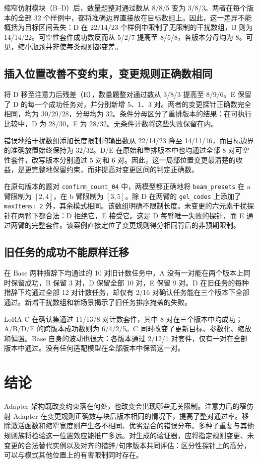 缩窄仿射模块（B--D）后，数量题整对通过数从 8/8/5 变为 3/8/3。两者在每个版本的全部 32 个样例中，都将准确边界直接放在目标数组上。因此，这一差异不能概括为目标区间丢失：D 在 22/14/23 个样例中限制了无限制的干扰数组，B 则为 14/14/22。可空性套件成功数反而从 5/2/7 提高至 8/5/8，各版本分母均为 8。可见，缩小瓶颈并非使每类规则都变差。

\subsection{插入位置改善不变约束，变更规则正确数相同}
将 D 移至注意力后残差（E），数量题整对通过数从 3/8/3 提高至 8/9/6。E 保留了 D 的每一个成功任务对，并分别新增 5、1、3 对。两者的变更探针正确数完全相同，均为 30/29/28，分母均为 32。条件分母区分了重排版本的结果：在可执行比较中，D 为 28/30，E 为 28/32。无条件计数将这些失败保留在内。

错误地给干扰数组添加长度限制的输出数从 22/14/23 降至 14/11/16，而目标边界的准确放置始终保持为 32/32。D/E 在原始和重排版本中也均通过全部 8 对可空性套件，改写版本分别通过 5 对和 6 对。因此，这一局部位置变更最清楚的收益，是更完整地保留约束，而非提高对变更区间的判定正确数。

在原句版本的题对 \texttt{confirm\_count\_04} 中，两模型都正确地将 \texttt{beam\_presets} 在 a 臂限制为 $[2,4]$，在 b 臂限制为 $[3,5]$。除 D 在两臂的 \texttt{gel\_codes} 上添加了 \texttt{maxItems: 2} 外，其余模式相同。该数组明确不限制长度。未变更的六元素干扰探针在两臂下都合法：D 拒绝它，E 接受它。这是 D 每臂唯一失败的探针，而 E 通过两臂的完整套件。该案例直接定位了变更规则得分相同背后的非预期限制。

\subsection{旧任务的成功不能原样迁移}
在 Base 两种措辞下均通过的 10 对旧计数任务中，A 没有一对能在两个版本上同时保留成功，B 保留 3 对，D 保留全部 10 对，E 保留 9 对。D 在旧任务的每种措辞下均通过全部 12 对计数任务，却仅有 2/16 对确认任务能在三个版本下全部通过。新增干扰数组和新场景揭示了旧任务排序掩盖的失败。

LoRA C 在确认集通过 11/13/8 对计数套件，其中 8 对在三个版本中均成功；A/B/D/E 的跨版本成功数则为 6/4/2/5。C 同时改变了更新目标、参数化、缩放和偏置。Base 自身的波动也很大：各版本通过 2/12/1 对套件，仅有一对在全部版本中通过。没有任何适配模型在全部版本中保留这一对。

\section{结论}
Adapter 架构既改变约束落在何处，也改变会出现哪些无关限制。注意力后的窄仿射 Adapter 在变更规则正确数与块后版本相同的情况下，提高了整对通过率。移除激活函数和缩窄宽度则产生各不相同、优劣混合的错误分布。多种子重复与其他规则族将检验这一位置效应能推广多远。对生成的验证器，应将指定规则变更、未变更的合法替代实例以及对齐的措辞/句序版本共同评估：区分性探针上的高分，可以与模式其他位置上的有害限制同时存在。

